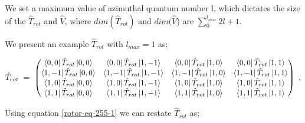 \documentclass{article}
\begin{document}
We set a maximum value of azimuthal quantum number l, which dictates the size of the \begin{math} \hat{T}_{rot} \end{math} and \begin{math} \hat{V} \end{math}, where \begin{math} dim(\hat{T}_{rot}) \end{math} and \begin{math} dim(\hat{V} \end{math}) are \begin{math} \sum_{0}^{l_{max}} 2l + 1 \end{math}. 

We present an example \begin{math} \hat{T}_{rot} \end{math} with \begin{math} l_{max} = 1 \end{math} as;

\begin{equation} \label{rotor-eq-266-1}
\hat{T}_{rot} \hspace{0.125cm} = \hspace{0.125cm} \begin{pmatrix} \bra{0,0}\hat{T}_{rot}\ket{0,0} & \bra{0,0}\hat{T}_{rot}\ket{1,-1} & \bra{0,0}\hat{T}_{rot}\ket{1,0} & \bra{0,0}\hat{T}_{rot}\ket{1,1} \\ \bra{1,-1}\hat{T}_{rot}\ket{0,0} & \bra{1,-1}\hat{T}_{rot}\ket{1,-1} & \bra{1,-1}\hat{T}_{rot}\ket{1,0} & \bra{1,-1}\hat{T}_{rot}\ket{1,1} \\ \bra{1,0}\hat{T}_{rot}\ket{0,0} & \bra{1,0}\hat{T}_{rot}\ket{1,-1} & \bra{1,0}\hat{T}_{rot}\ket{1,0} & \bra{1,0}\hat{T}_{rot}\ket{1,1} \\ \bra{1,1}\hat{T}_{rot}\ket{0,0} & \bra{1,1}\hat{T}_{rot}\ket{1,-1} & \bra{1,1}\hat{T}_{rot}\ket{1,0} & \bra{1,1}\hat{T}_{rot}\ket{1,1}
\end{pmatrix} \hspace{0.125cm} ,
\end{equation} 

Using equation \ref{rotor-eq-255-1} we can restate \begin{math} \hat{T}_{rot} \end{math} as;
\end{document}
